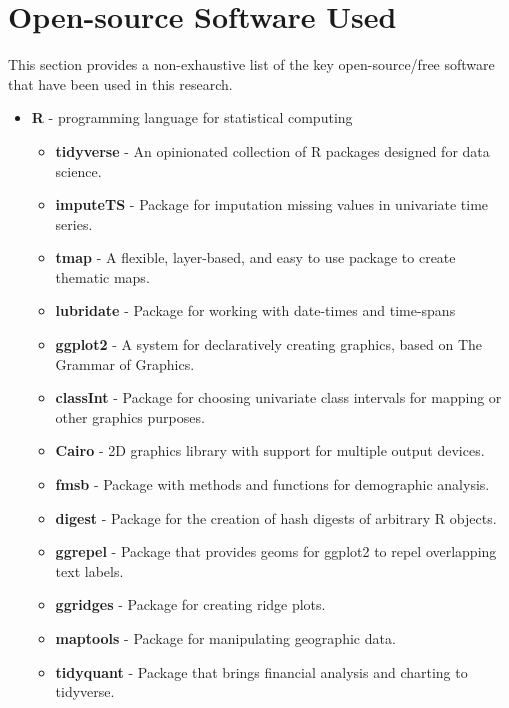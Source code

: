 \vspace{1em}
\inputminted{javascript}{analysis/data-collection/samplepacket.json}
\pagebreak

\section{Open-source Software Used}\label{appendix:software}

This section provides a non-exhaustive list of the key open-source/free software that have been used in this research.

\begin{itemize}
\item \textbf{R} - programming language for statistical computing
    \begin{itemize}
      \item \textbf{tidyverse} - An opinionated collection of R packages designed for data science. 
      \item \textbf{imputeTS} - Package for imputation missing values in univariate time series.
      \item \textbf{tmap} - A flexible, layer-based, and easy to use package to create thematic maps.
      \item \textbf{lubridate} - Package for working with date-times and time-spans
      \item \textbf{ggplot2} - A system for declaratively creating graphics, based on The Grammar of Graphics.
      \item \textbf{classInt} -  Package for choosing univariate class intervals for mapping or other graphics purposes.
      \item \textbf{Cairo} - 2D graphics library with support for multiple output devices.
      \item \textbf{fmsb} - Package with methods and functions for demographic analysis.
      \item \textbf{digest} - Package for the creation of hash digests of arbitrary R objects.
      \item \textbf{ggrepel} - Package that provides geoms for ggplot2 to repel overlapping text labels.
      \item \textbf{ggridges} - Package for creating ridge plots.
      \item \textbf{maptools} - Package for manipulating geographic data.
      \item \textbf{tidyquant} - Package that brings financial analysis and charting to tidyverse.

\end{itemize}
\end{itemize}

